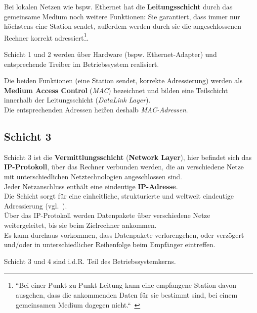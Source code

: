 \noindent
Bei lokalen Netzen wie {bspw.} Ethernet hat die \textbf{Leitungsschicht} durch das gemeinsame Medium noch weitere Funktionen: Sie garantiert, dass immer nur höchstens eine Station sendet, außerdem werden durch sie die angeschlossenen Rechner korrekt adressiert\footnote{
``Bei einer Punkt-zu-Punkt-Leitung kann eine empfangene Station davon ausgehen, dass die ankommenden Daten für sie bestimmt sind, bei einem gemeinsamen Medium dagegen nicht.``~\cite[257]{Oec22}
}.

\begin{tcolorbox}[enlarge top by=0.5cm,enlarge bottom by=0.5cm]
    Schicht 1 und 2 werden über Hardware ({bspw.} Ethernet-Adapter) und entsprechende Treiber im Betriebssystem realisiert.
\end{tcolorbox}

\noindent
Die beiden Funktionen (eine Station sendet, korrekte Adressierung) werden als \textbf{Medium Access Control} (\textit{MAC}) bezeichnet und bilden eine Teilschicht innerhalb der Leitungsschicht (\textit{DataLink Layer}).\\
Die entsprechenden Adressen heißen deshalb \textit{MAC-Adressen}.

\subsection*{Schicht 3}
Schicht 3 ist die \textbf{Vermittlungsschicht} (\textbf{Network Layer}), hier befindet sich das \textbf{IP-Protokoll}, über das Rechner verbunden werden, die an verschiedene Netze mit unterschiedlichen Netztechnologien angeschlossen sind.\\

\noindent
Jeder Netzanschluss enthält eine eindeutige \textbf{IP-Adresse}.\\
Die Schicht sorgt für eine einheitliche, strukturierte und weltweit eindeutige Adressierung (vgl.~\cite[258]{Oec22}).\\

\noindent
Über das IP-Protokoll werden Datenpakete über verschiedene Netze weitergeleitet, bis sie beim Zielrechner ankommen.\\

\noindent
Es kann durchaus vorkommen, dass Datenpakete verlorengehen, oder verzögert und/oder in unterschiedlicher Reihenfolge beim Empfänger eintreffen.

\begin{tcolorbox}[enlarge top by=0.5cm,enlarge bottom by=0.5cm]
    Schicht 3 und 4 sind i.d.R. Teil des Betriebssystemkerns.
\end{tcolorbox}

